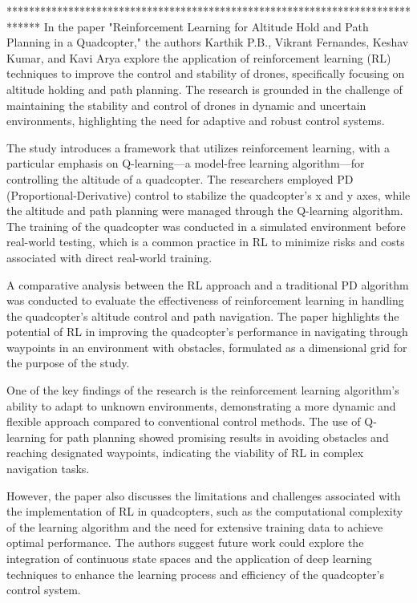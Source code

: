 \documentclass{article}
\begin{document}
******************************************************************************
In the paper \cite{ReinforcementLearning} "Reinforcement Learning for Altitude Hold and Path Planning in a Quadcopter," the authors Karthik P.B., Vikrant Fernandes, Keshav Kumar, and Kavi Arya explore the application of reinforcement learning (RL) techniques to improve the control and stability of drones, specifically focusing on altitude holding and path planning. The research is grounded in the challenge of maintaining the stability and control of drones in dynamic and uncertain environments, highlighting the need for adaptive and robust control systems.

The study introduces a framework that utilizes reinforcement learning, with a particular emphasis on Q-learning—a model-free learning algorithm—for controlling the altitude of a quadcopter. The researchers employed PD (Proportional-Derivative) control to stabilize the quadcopter's x and y axes, while the altitude and path planning were managed through the Q-learning algorithm. The training of the quadcopter was conducted in a simulated environment before real-world testing, which is a common practice in RL to minimize risks and costs associated with direct real-world training.

A comparative analysis between the RL approach and a traditional PD algorithm was conducted to evaluate the effectiveness of reinforcement learning in handling the quadcopter's altitude control and path navigation. The paper highlights the potential of RL in improving the quadcopter's performance in navigating through waypoints in an environment with obstacles, formulated as a dimensional grid for the purpose of the study.

One of the key findings of the research is the reinforcement learning algorithm's ability to adapt to unknown environments, demonstrating a more dynamic and flexible approach compared to conventional control methods. The use of Q-learning for path planning showed promising results in avoiding obstacles and reaching designated waypoints, indicating the viability of RL in complex navigation tasks.

However, the paper also discusses the limitations and challenges associated with the implementation of RL in quadcopters, such as the computational complexity of the learning algorithm and the need for extensive training data to achieve optimal performance. The authors suggest future work could explore the integration of continuous state spaces and the application of deep learning techniques to enhance the learning process and efficiency of the quadcopter's control system.
\end{document}
